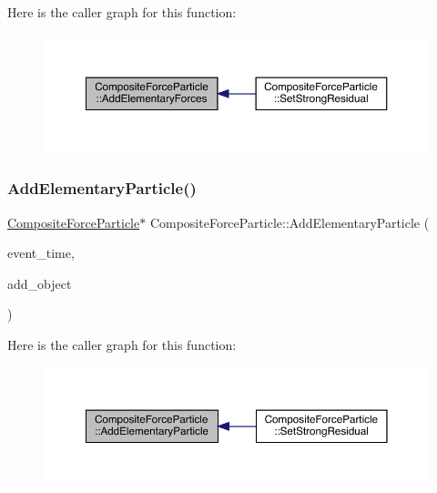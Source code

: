 Here is the caller graph for this function\+:\nopagebreak
\begin{figure}[H]
\begin{center}
\leavevmode
\includegraphics[width=350pt]{class_composite_force_particle_ad0e97ed38272c7861d162afdf0db33c7_icgraph}
\end{center}
\end{figure}
\mbox{\label{class_composite_force_particle_a27924093abdaa2f19902a32a068fa324}} 
\subsubsection{\texorpdfstring{Add\+Elementary\+Particle()}{AddElementaryParticle()}}
{\footnotesize\ttfamily \hyperlink{class_composite_force_particle}{Composite\+Force\+Particle}$\ast$ Composite\+Force\+Particle\+::\+Add\+Elementary\+Particle (\begin{DoxyParamCaption}\item[{std\+::chrono\+::time\+\_\+point$<$ \hyperlink{universe_8h_a0ef8d951d1ca5ab3cfaf7ab4c7a6fd80}{Clock} $>$}]{event\+\_\+time,  }\item[{\hyperlink{class_composite_force_particle}{Composite\+Force\+Particle} $\ast$}]{add\+\_\+object }\end{DoxyParamCaption})}

Here is the caller graph for this function\+:\nopagebreak
\begin{figure}[H]
\begin{center}
\leavevmode
\includegraphics[width=350pt]{class_composite_force_particle_a27924093abdaa2f19902a32a068fa324_icgraph}
\end{center}
\end{figure}
\mbox{\label{class_composite_force_particle_a2b88f000067b5d430d1850e75b733f56}} 
